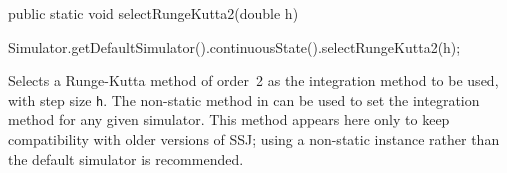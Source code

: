 \begin{code}

   public static void selectRungeKutta2(double h) \begin{hide} {
      Simulator.getDefaultSimulator().continuousState().selectRungeKutta2(h);
   } \end{hide}
\end{code}
  \begin{tabb}  Selects a Runge-Kutta method of order~2 as the integration
  method to be used, with step size \texttt{h}.
  The non-static method  in 
  can be used to set the integration method for any given simulator.
  This method appears here only to keep compatibility with older versions of SSJ; using
  a non-static  instance rather than the default simulator is recommended.
  \end{tabb}
\begin{code}\begin{hide}
}\end{hide}
\end{code}
